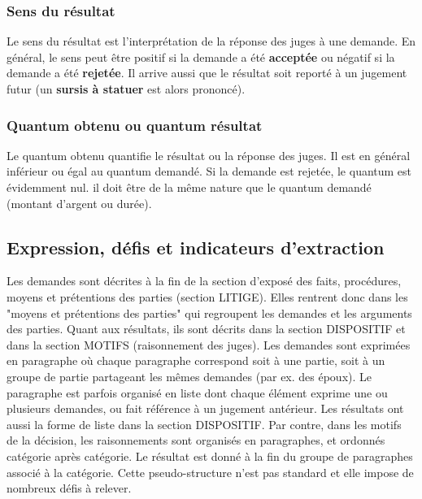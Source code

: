 \subsubsection{Sens du résultat}
Le sens du résultat est l'interprétation de la réponse des juges à une demande. En général, le sens peut être positif si la demande a été \textbf{acceptée} ou négatif si la demande a été \textbf{rejetée}. Il arrive aussi que le résultat soit reporté à un jugement futur (un \textbf{sursis à statuer} est alors prononcé). 

\subsubsection{Quantum obtenu ou quantum résultat}
Le quantum obtenu quantifie le résultat ou la réponse des juges. Il est en général inférieur ou égal au quantum demandé. Si la demande est rejetée, le quantum est évidemment nul. il doit être de la même nature que le quantum demandé (montant d'argent ou durée).

\subsection{Expression, défis et indicateurs d'extraction}
Les demandes sont décrites à la fin de la section d'exposé des faits, procédures, moyens et prétentions des parties (section LITIGE). Elles rentrent donc dans les "moyens et prétentions des parties" qui regroupent les demandes et les arguments des parties. Quant aux résultats, ils sont décrits dans la section DISPOSITIF et dans la section MOTIFS (raisonnement des juges). Les demandes sont exprimées en paragraphe où chaque paragraphe correspond soit à une partie, soit à un groupe de partie partageant les mêmes demandes (par ex. des époux). Le paragraphe est parfois organisé en liste dont chaque élément exprime une ou plusieurs demandes, ou fait référence à un jugement antérieur. Les résultats ont aussi la forme de liste dans la section DISPOSITIF. Par contre, dans les motifs de la décision, les raisonnements sont organisés en paragraphes, et ordonnés catégorie après catégorie. Le résultat est donné à la fin du groupe de paragraphes associé à la catégorie. Cette pseudo-structure n'est pas standard et elle impose de nombreux défis à relever.

